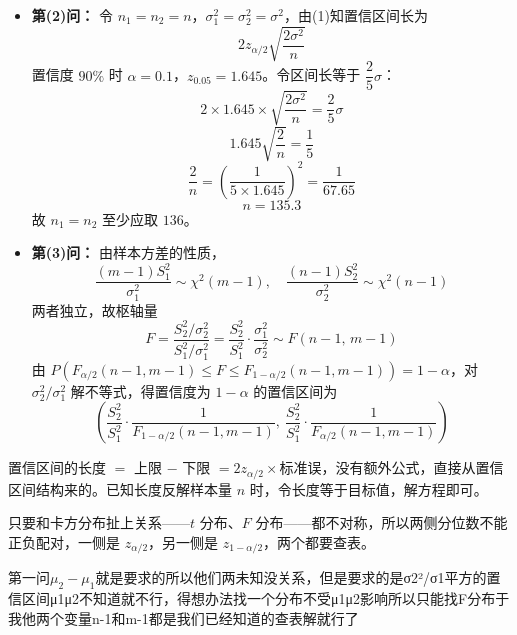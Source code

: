 \begin{solution}
\begin{itemize}
    \item \textbf{第(2)问：} 令 $n_1 = n_2 = n$，$\sigma_1^2 = \sigma_2^2 = \sigma^2$，由(1)知置信区间长为
    $$2z_{\alpha/2}\sqrt{\frac{2\sigma^2}{n}}$$
    置信度 $90\%$ 时 $\alpha = 0.1$，$z_{0.05} = 1.645$。令区间长等于 $\dfrac{2}{5}\sigma$：
    $$2 \times 1.645 \times \sqrt{\frac{2\sigma^2}{n}} = \frac{2}{5}\sigma$$
    $$1.645\sqrt{\frac{2}{n}} = \frac{1}{5}$$
    $$\frac{2}{n} = \left(\frac{1}{5 \times 1.645}\right)^2 = \frac{1}{67.65}$$
    $$n = 135.3$$
    故 $n_1 = n_2$ 至少应取 $136$。

    \item \textbf{第(3)问：} 由样本方差的性质，
    $$\frac{(m-1)S_1^2}{\sigma_1^2} \sim \chi^2(m-1), \quad \frac{(n-1)S_2^2}{\sigma_2^2} \sim \chi^2(n-1)$$
    两者独立，故枢轴量
    $$F = \frac{S_2^2/\sigma_2^2}{S_1^2/\sigma_1^2} = \frac{S_2^2}{S_1^2} \cdot \frac{\sigma_1^2}{\sigma_2^2} \sim F(n-1,\,m-1)$$
    由 $P\!\left(F_{\alpha/2}(n-1,m-1) \leq F \leq F_{1-\alpha/2}(n-1,m-1)\right) = 1-\alpha$，对 $\sigma_2^2/\sigma_1^2$ 解不等式，得置信度为 $1-\alpha$ 的置信区间为
    $$\left(\frac{S_2^2}{S_1^2} \cdot \frac{1}{F_{1-\alpha/2}(n-1,m-1)},\ \frac{S_2^2}{S_1^2} \cdot \frac{1}{F_{\alpha/2}(n-1,m-1)}\right)$$
\end{itemize}
\end{solution}
\begin{dxtips}
    \begin{note}
    置信区间的长度 $=$ 上限 $-$ 下限 $= 2z_{\alpha/2} \times \text{标准误}$，没有额外公式，直接从置信区间结构来的。已知长度反解样本量 $n$ 时，令长度等于目标值，解方程即可。
\end{note}
\end{dxtips}
\begin{dxtips}
    只要和卡方分布扯上关系——$t$ 分布、$F$ 分布——都不对称，所以两侧分位数不能正负配对，一侧是 $z_{\alpha/2}$，另一侧是 $z_{1-\alpha/2}$，两个都要查表。
\end{dxtips}
\begin{dxtips}
    第一问$\mu_2-\mu_1$就是要求的所以他们两未知没关系，但是要求的是σ2²/σ1平方的置信区间μ1μ2不知道就不行，得想办法找一个分布不受μ1μ2影响所以只能找F分布于我他两个变量n-1和m-1都是我们已经知道的查表解就行了
\end{dxtips}
